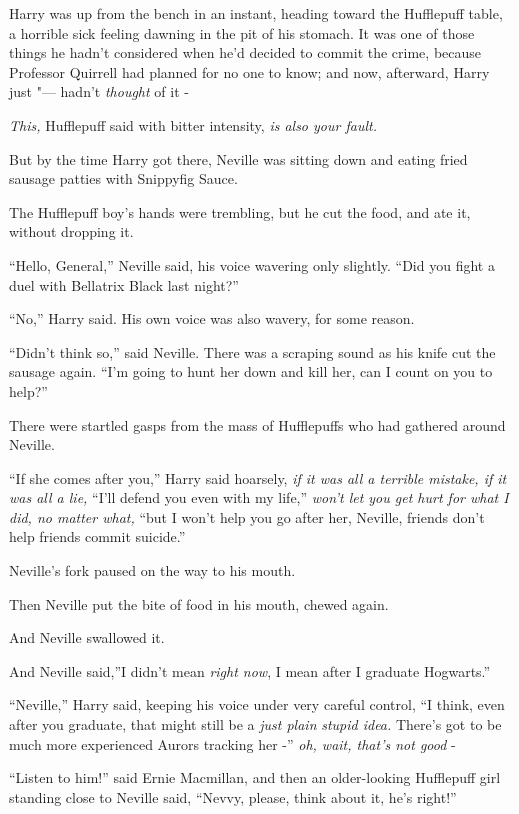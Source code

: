Harry was up from the bench in an instant, heading toward the Hufflepuff
table, a horrible sick feeling dawning in the pit of his stomach. It was
one of those things he hadn't considered when he'd decided to commit the
crime, because Professor Quirrell had planned for no one to know; and
now, afterward, Harry just "--- hadn't \emph{thought} of it -

\emph{This,} Hufflepuff said with bitter intensity, \emph{is also your
fault.}

But by the time Harry got there, Neville was sitting down and eating
fried sausage patties with Snippyfig Sauce.

The Hufflepuff boy's hands were trembling, but he cut the food, and ate
it, without dropping it.

``Hello, General,'' Neville said, his voice wavering only slightly.
``Did you fight a duel with Bellatrix Black last night?''

``No,'' Harry said. His own voice was also wavery, for some reason.

``Didn't think so,'' said Neville. There was a scraping sound as his
knife cut the sausage again. ``I'm going to hunt her down and kill her,
can I count on you to help?''

There were startled gasps from the mass of Hufflepuffs who had gathered
around Neville.

``If she comes after you,'' Harry said hoarsely, \emph{if it was all a
terrible mistake, if it was all a lie,} ``I'll defend you even with my
life,'' \emph{won't let you get hurt for what I did, no matter what,}
``but I won't help you go after her, Neville, friends don't help friends
commit suicide.''

Neville's fork paused on the way to his mouth.

Then Neville put the bite of food in his mouth, chewed again.

And Neville swallowed it.

And Neville said,''I didn't mean \emph{right now}, I mean after I
graduate Hogwarts.''

``Neville,'' Harry said, keeping his voice under very careful control,
``I think, even after you graduate, that might still be a \emph{just
plain} \emph{stupid idea.} There's got to be much more experienced
Aurors tracking her -'' \emph{oh, wait, that's not good} -

``Listen to him!'' said Ernie Macmillan, and then an older-looking
Hufflepuff girl standing close to Neville said, ``Nevvy, please, think
about it, he's right!''

